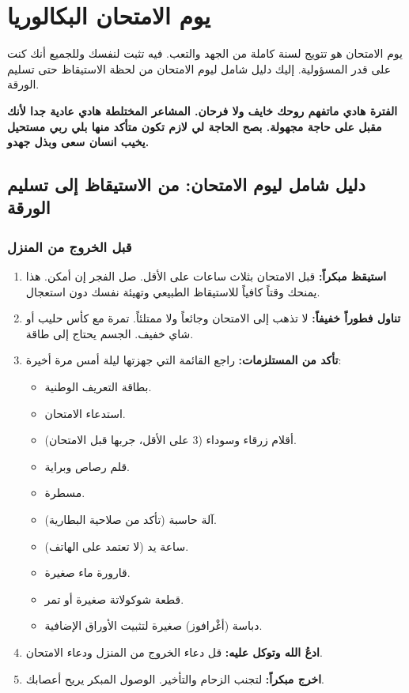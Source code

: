 \documentclass[12pt,a4paper]{book}
\newcommand{\importantAr}[1]{%
	\begin{important}
		\bfseries #1
	\end{important}
}
\begin{document}

	\chapter{يوم الامتحان البكالوريا}
	\label{chap:exam-day}
	
	يوم الامتحان هو تتويج لسنة كاملة من الجهد والتعب. فيه تثبت لنفسك وللجميع أنك كنت على قدر المسؤولية. إليك دليل شامل ليوم الامتحان من لحظة الاستيقاظ حتى تسليم الورقة.
	
	\importantAr{الفترة هادي ماتفهم روحك خايف ولا فرحان. المشاعر المختلطة هادي عادية جدا لأنك مقبل على حاجة مجهولة. بصح الحاجة لي لازم تكون متأكد منها بلي ربي مستحيل يخيب انسان سعى وبذل جهدو.}
	
	\section{دليل شامل ليوم الامتحان: من الاستيقاظ إلى تسليم الورقة}
	
	\subsection{قبل الخروج من المنزل}
	\begin{enumerate}
		\item \textbf{استيقظ مبكراً:} قبل الامتحان بثلاث ساعات على الأقل. صل الفجر إن أمكن. هذا يمنحك وقتاً كافياً للاستيقاظ الطبيعي وتهيئة نفسك دون استعجال.
		\item \textbf{تناول فطوراً خفيفاً:} لا تذهب إلى الامتحان وجائعاً ولا ممتلئاً. تمرة مع كأس حليب أو شاي خفيف. الجسم يحتاج إلى طاقة.
		\item \textbf{تأكد من المستلزمات:} راجع القائمة التي جهزتها ليلة أمس مرة أخيرة:
		\begin{itemize}
			\item بطاقة التعريف الوطنية.
			\item استدعاء الامتحان.
			\item أقلام زرقاء وسوداء (3 على الأقل، جربها قبل الامتحان).
			\item قلم رصاص وبراية.
			\item مسطرة.
			\item آلة حاسبة (تأكد من صلاحية البطارية).
			\item ساعة يد (لا تعتمد على الهاتف).
			\item قارورة ماء صغيرة.
			\item قطعة شوكولاتة صغيرة أو تمر.
			\item دباسة (أغْرافوز) صغيرة لتثبيت الأوراق الإضافية.
		\end{itemize}
		\item \textbf{ادعُ الله وتوكل عليه:} قل دعاء الخروج من المنزل ودعاء الامتحان.
		\item \textbf{اخرج مبكراً:} لتجنب الزحام والتأخير. الوصول المبكر يريح أعصابك.
	\end{enumerate}
	
\end{document}
